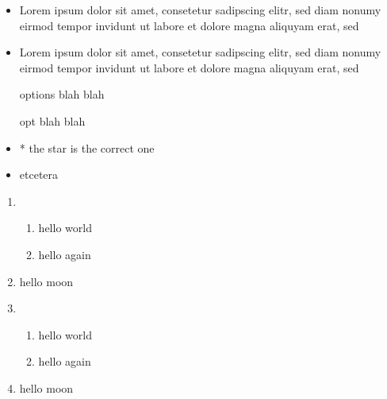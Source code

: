 \documentclass{article}
\begin{document}
\begin{itemize}
  \item Lorem ipsum dolor sit amet, consetetur sadipscing elitr, sed diam
  nonumy eirmod tempor invidunt ut labore et dolore magna aliquyam erat, sed
\item Lorem ipsum dolor sit amet, consetetur sadipscing elitr, sed diam
  nonumy eirmod tempor invidunt ut labore et dolore magna aliquyam erat, sed
\end{itemize}

  \begin{itemize}
    something here

    \item [options] blah blah
      \item[opt] blah blah
    \item * the star is the correct one
    \item etcetera
  \end{itemize}

\begin{enumerate}
    \item \begin{enumerate}
        \item hello
          world
    \item hello
      again
  \end{enumerate}
  \item hello
      moon
    \item
      \begin{enumerate}
      \item hello
      world
    \item hello
        again
\end{enumerate}
\item hello
    moon
    \end{enumerate}

  
\end{document}
